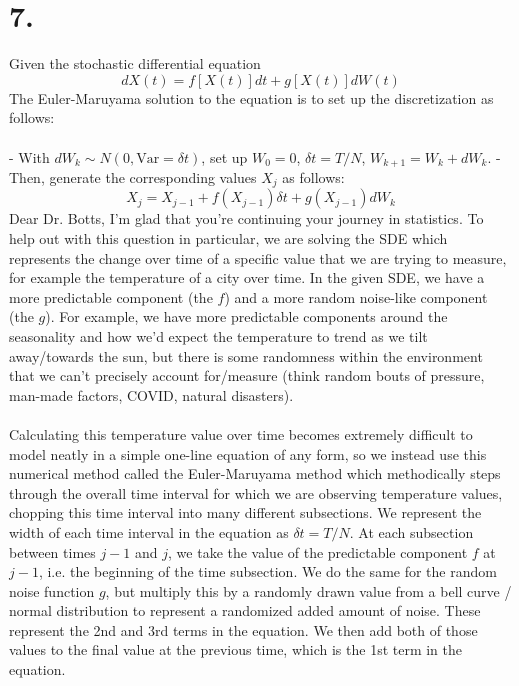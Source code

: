 \documentclass{article}
\begin{document}
{\Large 

\section*{7.}

Given the stochastic differential equation
\[
  dX(t) = f[X(t)]dt + g[X(t)]dW(t)
\]
The Euler-Maruyama solution to the equation is to set up the discretization as follows: \\ \\ 
- With \(dW_k \sim N(0, \text{Var} = \delta t)\), set up \(W_0 = 0\), \(\delta t = T / N\), \(W_{k+1} = W_k + dW_k\).
- Then, generate the corresponding values \(X_j\) as follows:
\[
  X_j = X_{j-1} + f(X_{j-1})\delta t + g(X_{j-1})dW_k
\]
Dear Dr. Botts, I'm glad that you're continuing your journey in statistics. To help out with this question in particular, we are solving the SDE which represents the change over time of a specific value that we are trying to measure, for example the temperature of a city over time. In the given SDE, we have a more predictable component (the \(f\)) and a more random noise-like component (the \(g\)). For example, we have more predictable components around the seasonality and how we'd expect the temperature to trend as we tilt away/towards the sun, but there is some randomness within the environment that we can't precisely account for/measure (think random bouts of pressure, man-made factors, COVID, natural disasters). \\ \\
Calculating this temperature value over time becomes extremely difficult to model neatly in a simple one-line equation of any form, so we instead use this numerical method called the Euler-Maruyama method which methodically steps through the overall time interval for which we are observing temperature values, chopping this time interval into many different subsections. We represent the width of each time interval in the equation as \(\delta t = T / N\). At each subsection between times \(j-1\) and \(j\), we take the value of the predictable component \(f\) at \(j-1\), i.e. the beginning of the time subsection. We do the same for the random noise function \(g\), but multiply this by a randomly drawn value from a bell curve / normal distribution to represent a randomized added amount of noise. These represent the 2nd and 3rd terms in the equation. We then add both of those values to the final value at the previous time, which is the 1st term in the equation. \\ \\
}
\end{document}
